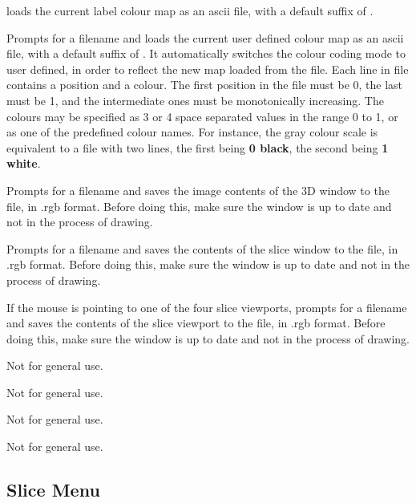 \begin{description}
        loads the current label colour map as an ascii file, with a default
        suffix of .
\item[\menutwo{File}{Load UserDef ColCode}]  Prompts for a filename and
        loads the current user defined colour map as an ascii file,
        with a default suffix of .  It automatically switches
        the colour coding mode to user defined, in order to reflect the
        new map loaded from the file.  Each line in file contains a position
        and a colour.  The first position in the file must be 0, the last
        must be 1, and the intermediate ones must be monotonically increasing.
        The colours may be specified as 3 or 4 space separated values in the
        range 0 to 1, or as one of the predefined colour names.  For instance,
        the gray colour scale is equivalent to a file with two lines, the
        first being {\bf 0  black}, the second being {\bf 1 white}.

        
\item[\menutwo{File}{Save 3D Window}]  Prompts for a filename and saves the
      image contents of the 3D window to the file, in .rgb format.  Before
      doing this, make sure the window is up to date and not in the process of
      drawing.
\item[\menutwo{File}{Save Slice Window}]  Prompts for a filename and saves the
      contents of the slice window to the file, in .rgb format.  Before doing
      this, make sure the window is up to date and not in the process of
      drawing.
\item[\menutwo{File}{Save Slice Image}]  If the mouse is pointing to one
      of the four slice viewports, prompts for a filename and saves the
      contents of the slice viewport to the file, in .rgb format.  Before doing
      this, make sure the window is up to date and not in the process of
      drawing.

\item[\menutwo{File}{Load Poly Visib.}]  Not for general use.
\item[\menutwo{File}{Save Poly Visib.}]  Not for general use.
\item[\menutwo{File}{Save Bintree}]  Not for general use.
\item[\menutwo{File}{Load Bintree}]  Not for general use.
\end{description}

\subsection{Slice Menu}

